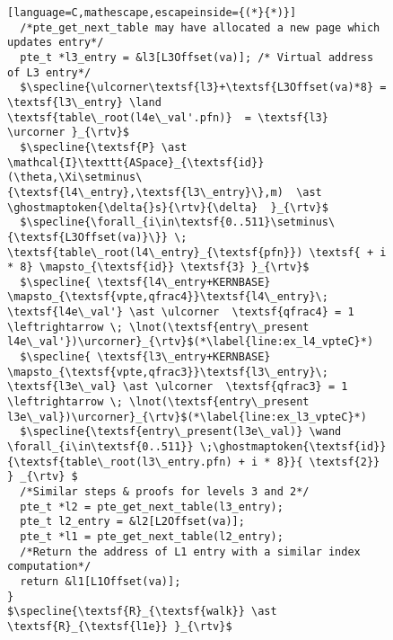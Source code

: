 \begin{figure}
\begin{lstlisting}[language=C,mathescape,escapeinside={(*}{*)}]
  /*pte_get_next_table may have allocated a new page which updates entry*/
  pte_t *l3_entry = &l3[L3Offset(va)]; /* Virtual address of L3 entry*/
  $\specline{\ulcorner\textsf{l3}+\textsf{L3Offset(va)*8} = \textsf{l3\_entry} \land \textsf{table\_root(l4e\_val'.pfn)}  = \textsf{l3} \urcorner }_{\rtv}$
  $\specline{\textsf{P} \ast \mathcal{I}\texttt{ASpace}_{\textsf{id}}(\theta,\Xi\setminus\{\textsf{l4\_entry},\textsf{l3\_entry}\},m)  \ast \ghostmaptoken{\delta{}s}{\rtv}{\delta}  }_{\rtv}$
  $\specline{\forall_{i\in\textsf{0..511}\setminus\{\textsf{L3Offset(va)}\}} \; \textsf{table\_root(l4\_entry}_{\textsf{pfn}}) \textsf{ + i * 8} \mapsto_{\textsf{id}} \textsf{3} }_{\rtv}$
  $\specline{ \textsf{l4\_entry+KERNBASE} \mapsto_{\textsf{vpte,qfrac4}}\textsf{l4\_entry}\; \textsf{l4e\_val'} \ast \ulcorner  \textsf{qfrac4} = 1 \leftrightarrow \; \lnot(\textsf{entry\_present l4e\_val'})\urcorner}_{\rtv}$(*\label{line:ex_l4_vpteC}*)
  $\specline{ \textsf{l3\_entry+KERNBASE} \mapsto_{\textsf{vpte,qfrac3}}\textsf{l3\_entry}\; \textsf{l3e\_val} \ast \ulcorner  \textsf{qfrac3} = 1 \leftrightarrow \; \lnot(\textsf{entry\_present l3e\_val})\urcorner}_{\rtv}$(*\label{line:ex_l3_vpteC}*)
  $\specline{\textsf{entry\_present(l3e\_val)} \wand \forall_{i\in\textsf{0..511}} \;\ghostmaptoken{\textsf{id}}{\textsf{table\_root(l3\_entry.pfn) + i * 8}}{ \textsf{2}} } _{\rtv} $
  /*Similar steps & proofs for levels 3 and 2*/
  pte_t *l2 = pte_get_next_table(l3_entry);
  pte_t l2_entry = &l2[L2Offset(va)];
  pte_t *l1 = pte_get_next_table(l2_entry);
  /*Return the address of L1 entry with a similar index computation*/
  return &l1[L1Offset(va)]; 
}
$\specline{\textsf{R}_{\textsf{walk}} \ast \textsf{R}_{\textsf{l1e}} }_{\rtv}$
\end{lstlisting}


\end{figure}
